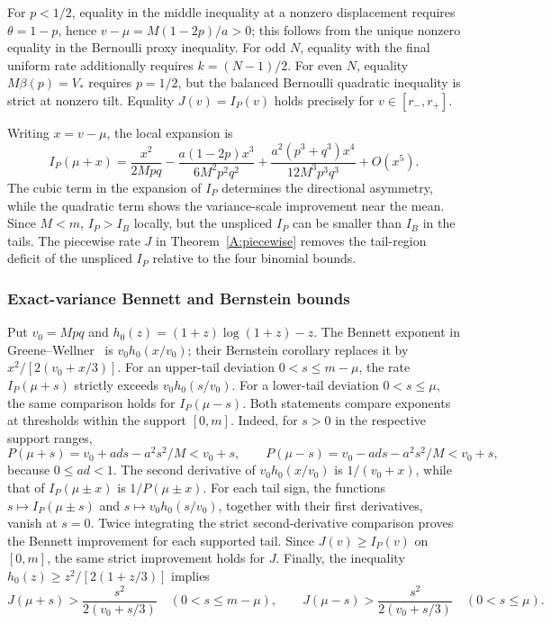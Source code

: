 \documentclass[11pt,a4paper]{article}
\begin{document}
For $p<1/2$, equality in the middle inequality at a nonzero displacement
requires $\theta=1-p$, hence $v-\mu=M(1-2p)/a>0$; this follows from the
unique nonzero equality in the Bernoulli proxy inequality.
For odd $N$, equality with the final uniform rate additionally requires
$k=(N-1)/2$. For even $N$, equality $M\beta(p)=V_*$ requires $p=1/2$,
but the balanced Bernoulli quadratic inequality is strict at nonzero tilt.
Equality $J(v)=I_P(v)$ holds precisely for $v\in[r_-,r_+]$.

Writing $x=v-\mu$, the local expansion is
\[
 I_P(\mu+x)=\frac{x^2}{2Mpq}
 -\frac{a(1-2p)x^3}{6M^2p^2q^2}
 +\frac{a^2(p^3+q^3)x^4}{12M^3p^3q^3}+O(x^5).
\]
The cubic term in the expansion of $I_P$ determines the directional asymmetry, while the quadratic term shows the variance-scale improvement
near the mean. Since $M<m$, $I_P>I_B$ locally, but the unspliced $I_P$
can be smaller than $I_B$ in the tails. The piecewise rate $J$ in Theorem~\ref{A:piecewise} removes
the tail-region deficit of the unspliced $I_P$ relative to the four binomial bounds.

\subsubsection{Exact-variance Bennett and Bernstein bounds}
Put $v_0=Mpq$ and $h_0(z)=(1+z)\log(1+z)-z$.
The Bennett exponent in Greene--Wellner~\cite[Theorem 3]{GreeneWellner} is
$v_0h_0(x/v_0)$; their Bernstein corollary replaces it by
$x^2/[2(v_0+x/3)]$. For an upper-tail deviation $0<s\le m-\mu$, the rate $I_P(\mu+s)$ strictly exceeds $v_0h_0(s/v_0)$. For a lower-tail deviation $0<s\le\mu$, the same comparison holds for $I_P(\mu-s)$. Both statements compare exponents at thresholds within the support $[0,m]$.
Indeed, for $s>0$ in the respective support ranges,
\[
 P(\mu+s)=v_0+ad s-a^2s^2/M<v_0+s,\qquad
 P(\mu-s)=v_0-ad s-a^2s^2/M<v_0+s,
\]
because $0\le ad<1$. The second derivative of $v_0h_0(x/v_0)$ is
$1/(v_0+x)$, while that of $I_P(\mu\pm x)$ is $1/P(\mu\pm x)$.
For each tail sign, the functions $s\mapsto I_P(\mu\pm s)$ and $s\mapsto v_0h_0(s/v_0)$, together with their first derivatives, vanish at $s=0$. Twice integrating the strict second-derivative comparison proves the Bennett improvement for each supported tail. Since $J(v)\ge I_P(v)$ on $[0,m]$, the same strict improvement holds for $J$. Finally, the inequality $h_0(z)\ge z^2/[2(1+z/3)]$ implies
\[
 J(\mu+s)>\frac{s^2}{2(v_0+s/3)}\quad(0<s\le m-\mu),\qquad
 J(\mu-s)>\frac{s^2}{2(v_0+s/3)}\quad(0<s\le\mu).
\]
\end{document}
